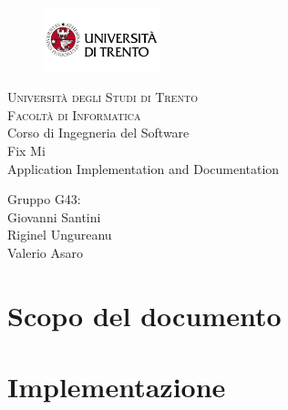 \documentclass{report}
\begin{document}
\begin{titlepage}
	\begin{figure}[t]
		\centering\includegraphics[width=0.3\textwidth]{images/unitn-logo}
	\end{figure}
	\begin{center}
		\textsc{ \LARGE{Università degli Studi di Trento \\}}
		\textsc{ \LARGE{Facoltà di Informatica\\ }}
		\textnormal{ \LARGE{Corso di Ingegneria del Software\\}}
		\vspace{30mm}
		\fontsize{10mm}{7mm}\selectfont
		\textup{Fix Mi \\ Application Implementation and Documentation}\\
	\end{center}

	\vspace{25mm}

	\centering
	\large Gruppo G43: \\ Giovanni Santini\\ Riginel Ungureanu \\ Valerio Asaro

	\vspace{20mm}


\end{titlepage}




\pagestyle{fancy}
\fancyhead[R]{\chaptername\ \thechapter}  %

\tableofcontents
\newpage



\section{Scopo del documento}


\section{Implementazione}
\end{document}
